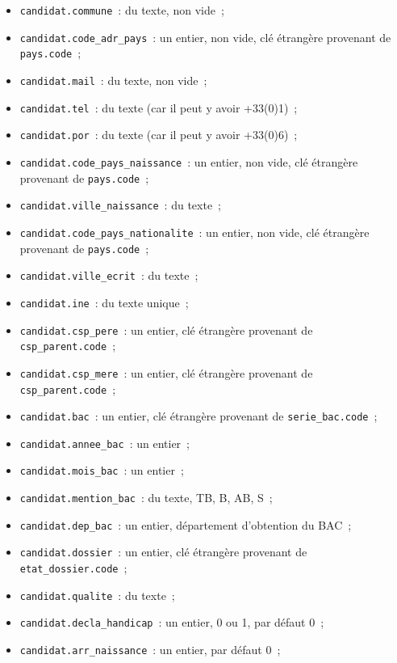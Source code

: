 \documentclass[12pt]{article}
\begin{document}
\begin{itemize}[label=\textbullet]
            \item \texttt{candidat.commune}~: du texte, non vide~;
            \item \texttt{candidat.code\_adr\_pays}~: un entier, non vide, clé étrangère provenant de \texttt{pays.code}~;
            \item \texttt{candidat.mail}~: du texte, non vide~;
            \item \texttt{candidat.tel}~: du texte (car il peut y avoir +33(0)1)~;
            \item \texttt{candidat.por}~: du texte (car il peut y avoir +33(0)6)~;
            \item \texttt{candidat.code\_pays\_naissance}~: un entier, non vide, clé étrangère provenant de \texttt{pays.code}~;
            \item \texttt{candidat.ville\_naissance}~: du texte~;
            \item \texttt{candidat.code\_pays\_nationalite}~: un entier, non vide, clé étrangère provenant de \texttt{pays.code}~;
            \item \texttt{candidat.ville\_ecrit}~: du texte~;
            \item \texttt{candidat.ine}~: du texte unique~;
            \item \texttt{candidat.csp\_pere}~: un entier, clé étrangère provenant de \texttt{csp\_parent.code}~;
            \item \texttt{candidat.csp\_mere}~: un entier, clé étrangère provenant de \texttt{csp\_parent.code}~;
            \item \texttt{candidat.bac}~: un entier, clé étrangère provenant de \texttt{serie\_bac.code}~;
            \item \texttt{candidat.annee\_bac}~: un entier~;
            \item \texttt{candidat.mois\_bac}~: un entier~;
            \item \texttt{candidat.mention\_bac}~: du texte, TB, B, AB, S~;
            \item \texttt{candidat.dep\_bac}~: un entier, département d'obtention du BAC~;
            \item \texttt{candidat.dossier}~: un entier, clé étrangère provenant de \texttt{etat\_dossier.code}~;
            \item \texttt{candidat.qualite}~: du texte~;
            \item \texttt{candidat.decla\_handicap}~: un entier, 0 ou 1, par défaut 0~;
            \item \texttt{candidat.arr\_naissance}~: un entier, par défaut 0~;

\end{itemize}
\end{document}
